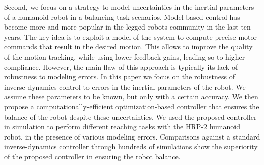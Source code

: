 \documentclass[english,a4paper,10pt,twoside]{StyleThese}
\begin{document}
\begin{vcenterpage}
 Second, we focus on a strategy to model uncertainties in the inertial parameters of a humanoid robot in a balancing task scenarios. Model-based control has become more and more popular in the legged robots community in the last ten years. The key idea is to exploit a model of the system to compute precise motor commands that result in the desired motion. This allows to improve the quality of the motion tracking, while using lower feedback gains, leading so to higher compliance. However, the main flaw of this approach is typically its lack of robustness to modeling errors. In this paper we focus on the robustness of inverse-dynamics control to errors in the inertial parameters of the robot. We assume these parameters to be known, but only with a certain accuracy. We then propose a computationally-efficient optimization-based controller that ensures the balance of the robot despite these uncertainties. We used the proposed controller in simulation to perform different reaching tasks with the HRP-2 humanoid robot, in the presence of various modeling errors. Comparisons against a standard inverse-dynamics controller through hundreds of simulations show the superiority of the proposed controller in ensuring the robot balance.
\end{vcenterpage}

\tableofcontents
\printnomenclature
\mtcfixnomenclature
\mainmatter

% 
% 
% 
% 


%


\end{document}
